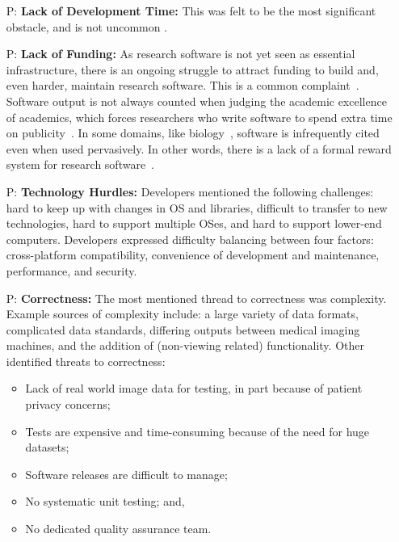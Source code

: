 \documentclass[doubleblind,12pt, 3p, times]{elsarticle}
\newcounter{pnum} %
\begin{document}
\begin{enumerate}

\item[P\refstepcounter{pnum}\thepnum \label{P_LackDevTime}:] \textbf{Lack of
Development Time:} This was felt to be the most significant obstacle, and
is not uncommon
\cite{PintoEtAl2018, PintoEtAl2016, WieseEtAl2019}.

\item[P\refstepcounter{pnum}\thepnum \label{P_LackFunding}:] \textbf{Lack of
Funding:} As research software is not yet seen as essential infrastructure,
there is an ongoing struggle to attract funding to build and, even harder, maintain
research software. This is a common complaint~\cite{GewaltigAndCannon2012, Goble2014, KaterbowAndFeulner2018}. %
Software output is not always counted when judging the academic excellence of
academics, which forces researchers who write software to spend extra time on
publicity~\cite{WieseEtAl2019}. In some domains, like
biology~\cite{HowisonAndBullard2016}, software is infrequently cited even when
used pervasively. In other words, there is a lack of a formal reward system for
research software~\cite{PintoEtAl2018}.

\item[P\refstepcounter{pnum}\thepnum \label{P_TechnologyHurdles}:]
\textbf{Technology Hurdles:} Developers mentioned the following challenges: hard
to keep up with changes in OS and libraries, difficult to transfer to new
technologies, hard to support multiple OSes, and hard to support lower-end
computers. Developers expressed difficulty balancing between four factors:
cross-platform compatibility, convenience of development and maintenance,
performance, and security.

\item[P\refstepcounter{pnum}\thepnum \label{P_Correctness}:]
\textbf{Correctness:} The most mentioned thread to correctness was complexity.
Example sources of complexity include: a large variety of data formats,
complicated data standards, differing outputs between medical imaging machines,
and the addition of (non-viewing related) functionality.  Other identified
threats to correctness:

\begin{itemize}
\item Lack of real world image data for testing, in part because of patient
privacy concerns;
\item Tests are expensive and time-consuming because of the need for huge datasets;
\item Software releases are difficult to manage;
\item No systematic unit testing; and,
\item No dedicated quality assurance team.
\end{itemize}


\end{enumerate}
\end{document}
